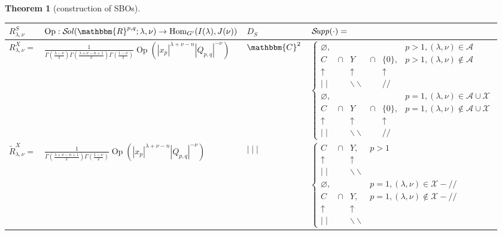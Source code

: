 \documentclass[12pt]{article} %
\newcommand{\nin}{\not\in}
\newcommand{\tmop}[1]{\ensuremath{\operatorname{#1}}}
\newtheorem{theorem}{Theorem}
\newcommand{\Sol}{\mathcal{S}\!{\it ol}}
\newcommand{\Supp}{\mathcal{S}\!{\it upp}}
\theoremstyle{definition}
\theoremstyle{exampstyle} \newtheorem{examp}[theorem]{Theorem}
\renewcommand{\Q}{Q_{p,q}}
\begin{document}
\begin{theorem}[construction of SBOs]
\hspace{-2.0cm}\begin{tabular}{@{}|@{}l@{}|@{}l@{}|l@{}|@{}l@{}|}
  \hline
  $R_{\lambda,\nu}^S$& $\tmop{Op} : 
  \Sol(\mathbbm{R}^{p, q} ; \lambda, \nu)
  \rightarrow \tmop{Hom}_{G'} (I (\lambda), J (\nu))$ & $D_S\,$ &
  $\,{\Supp} (\cdot)=$\\
  \hline
  $R_{\lambda, \nu}^X =$ & $ \frac{1}{\Gamma \left( \frac{\lambda - \nu}{2} \right) \Gamma \left(
  \frac{\lambda + \nu - n + 1}{2} \right) \Gamma \left( \frac{1 - \nu}{2}
  \right)}{\tmop{Op} \left(| x_p |^{\lambda + \nu - n}
  | \Q |^{- \nu} \right)}$ & $\mathbbm{C}^2$ & 
$\left\{\begin{array}{llllll}
	\varnothing, &  &  &  &  & p > 1, (\lambda, \nu) \in\mathcal{A}
  \\
  C & \cap & Y & \cap & \{ 0 \}, & p > 1, (\lambda, \nu) \nin 
  \mathcal{A}\\
  \uparrow &  & \uparrow &  & \uparrow & \\
  \mid \mid &  & \backslash\backslash &  & / / & \\
  \varnothing, &  &  &  &  & p = 1, (\lambda, \nu) \in \mathcal{A} \cup \mathcal{X}\\
  C & \cap & Y & \cap & \{ 0 \}, & p = 1, (\lambda, \nu) \nin \mathcal{A} \cup \mathcal{X}\\
  \uparrow &  & \uparrow &  & \uparrow & \\
  \mid \mid &  & \backslash\backslash &  & / / & 
\end{array}\right.$
  \\
  \hline
  $\tilde{R}^X_{\lambda, \nu} =$ & $\frac{1}{\Gamma \left( \frac{\lambda + \nu - n + 1}{2}
  \right) \Gamma \left( \frac{1 - \nu}{2} \right)}{\tmop{Op} \left( | x_p |^{\lambda +
  \nu - n} | \Q |^{- \nu}\right)} $ & $
   \mid \mid \mid$ &
$\left\{\begin{array}{llll}
  C & \cap & Y, & p > 1\\
  \uparrow &  & \uparrow & \\
  \mid \mid &  & \backslash\backslash & \\
  \varnothing, &  &  & p = 1, (\lambda, \nu) \in \mathcal{X}- / /\\
  C & \cap & Y, & p = 1, (\lambda, \nu) \nin \mathcal{X}- / /\\
  \uparrow &  & \uparrow & \\
  \mid \mid &  & \backslash\backslash & 
\end{array}\right.$
   \\

\end{tabular}
\end{theorem}
\end{document}
